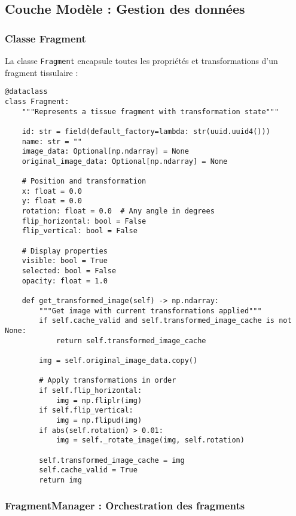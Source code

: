 \documentclass[12pt,a4paper]{report}
\begin{document}
\subsection{Couche Modèle : Gestion des données}

\subsubsection{Classe Fragment}

La classe \texttt{Fragment} encapsule toutes les propriétés et transformations d'un fragment tissulaire :

\begin{lstlisting}[caption=Structure de la classe Fragment]
@dataclass
class Fragment:
    """Represents a tissue fragment with transformation state"""
    
    id: str = field(default_factory=lambda: str(uuid.uuid4()))
    name: str = ""
    image_data: Optional[np.ndarray] = None
    original_image_data: Optional[np.ndarray] = None
    
    # Position and transformation
    x: float = 0.0
    y: float = 0.0
    rotation: float = 0.0  # Any angle in degrees
    flip_horizontal: bool = False
    flip_vertical: bool = False
    
    # Display properties
    visible: bool = True
    selected: bool = False
    opacity: float = 1.0
    
    def get_transformed_image(self) -> np.ndarray:
        """Get image with current transformations applied"""
        if self.cache_valid and self.transformed_image_cache is not None:
            return self.transformed_image_cache
            
        img = self.original_image_data.copy()
        
        # Apply transformations in order
        if self.flip_horizontal:
            img = np.fliplr(img)
        if self.flip_vertical:
            img = np.flipud(img)
        if abs(self.rotation) > 0.01:
            img = self._rotate_image(img, self.rotation)
            
        self.transformed_image_cache = img
        self.cache_valid = True
        return img
\end{lstlisting}

\subsubsection{FragmentManager : Orchestration des fragments}
\end{document}
